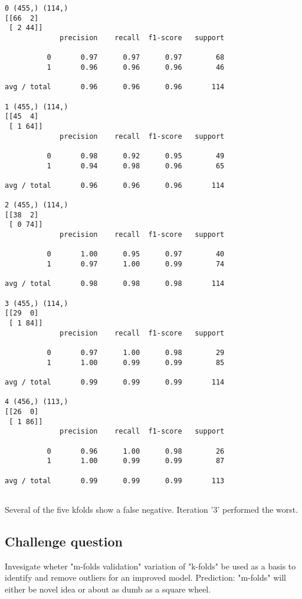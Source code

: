 \documentclass[11pt]{article}
\begin{document}
    \begin{Verbatim}[commandchars=\\\{\}]
0 (455,) (114,)
[[66  2]
 [ 2 44]]
             precision    recall  f1-score   support

          0       0.97      0.97      0.97        68
          1       0.96      0.96      0.96        46

avg / total       0.96      0.96      0.96       114

1 (455,) (114,)
[[45  4]
 [ 1 64]]
             precision    recall  f1-score   support

          0       0.98      0.92      0.95        49
          1       0.94      0.98      0.96        65

avg / total       0.96      0.96      0.96       114

2 (455,) (114,)
[[38  2]
 [ 0 74]]
             precision    recall  f1-score   support

          0       1.00      0.95      0.97        40
          1       0.97      1.00      0.99        74

avg / total       0.98      0.98      0.98       114

3 (455,) (114,)
[[29  0]
 [ 1 84]]
             precision    recall  f1-score   support

          0       0.97      1.00      0.98        29
          1       1.00      0.99      0.99        85

avg / total       0.99      0.99      0.99       114

4 (456,) (113,)
[[26  0]
 [ 1 86]]
             precision    recall  f1-score   support

          0       0.96      1.00      0.98        26
          1       1.00      0.99      0.99        87

avg / total       0.99      0.99      0.99       113


    \end{Verbatim}

    Several of the five kfolds show a false negative. Iteration '3'
performed the worst.

\subsection{Challenge question}\label{challenge-question}

Invesigate wheter "m-folds validation" variation of "k-folds" be used as
a basis to identify and remove outliers for an improved model.
Prediction: "m-folds" will either be novel idea or about as dumb as a
square wheel.
\end{document}
